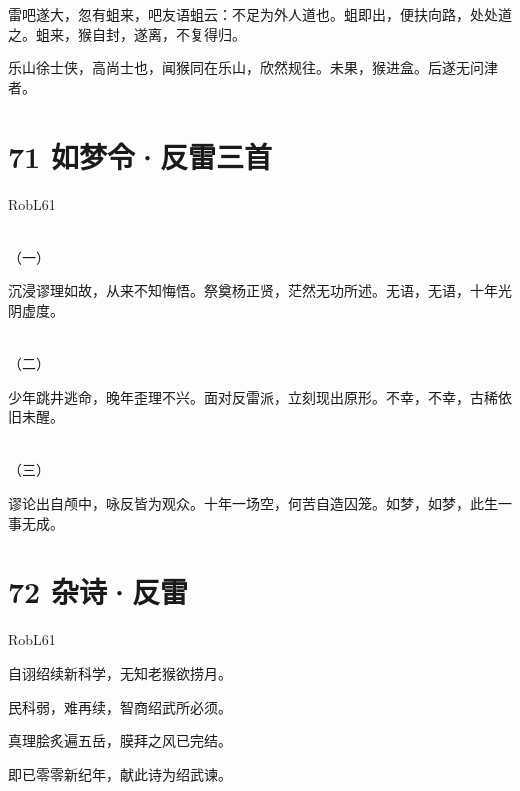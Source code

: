 \documentclass[UTF8,12pt,oneside]{ctexbook}
\begin{document}
        雷吧遂大，忽有蛆来，吧友语蛆云：不足为外人道也。蛆即出，便扶向路，处处道之。蛆来，猴自封，遂离，不复得归。
        
        乐山徐士侠，高尚士也，闻猴同在乐山，欣然规往。未果，猴进盒。后遂无问津者。
        
        \section{71 如梦令·反雷三首}
        \begin{center}
        RobL61
        
        ~\\
        \Large \kaishu
        （一）
        \songti \large
        \end{center}
        
        沉浸谬理如故，从来不知悔悟。祭奠杨正贤，茫然无功所述。无语，无语，十年光阴虚度。
        
        \begin{center}
        ~\\
        \Large \kaishu
        （二）
        \songti \large
        \end{center}
        
        少年跳井逃命，晚年歪理不兴。面对反雷派，立刻现出原形。不幸，不幸，古稀依旧未醒。
        
        \begin{center}
        ~\\
        \Large \kaishu
        （三）
        \songti \large
        \end{center}
        
        谬论出自颅中，咏反皆为观众。十年一场空，何苦自造囚笼。如梦，如梦，此生一事无成。
        
        \newpage
        
        \section{72 杂诗·反雷}
        \begin{center}
            RobL61
        \end{center}
        
        \begin{center}
            自诩绍续新科学，无知老猴欲捞月。
            
            民科弱，难再续，智商绍武所必须。
            
            真理脍炙遍五岳，膜拜之风已完结。
            
            即已零零新纪年，献此诗为绍武谏。
        \end{center}
        
\end{document}
